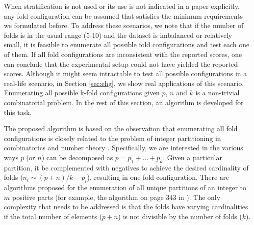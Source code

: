 \documentclass[3p, times]{elsarticle}
\begin{document}
When stratification is not used or its use is not indicated in a paper explicitly, any fold configuration can be assumed that satisfies the minimum requirements we formulated before. To address these scenarios, we note that if the number of folds is in the usual range (5-10) and the dataset is imbalanced or relatively small, it is feasible to enumerate all possible fold configurations and test each one of them. If all fold configurations are inconsistent with the reported scores, one can conclude that the experimental setup could not have yielded the reported scores. Although it might seem intractable to test all possible configurations in a real-life scenario, in Section \ref{sec:ehg}, we show real applications of this scenario. Enumerating all possible k-fold configurations given $p$, $n$ and $k$ is a non-trivial combinatorial problem. In the rest of this section, an algorithm is developed for this task.

The proposed algorithm is based on the observation that enumerating all fold configurations is closely related to the problem of integer partitioning in combinatorics and number theory \cite{intpart}. Specifically, we are interested in the various ways $p$ (or $n$) can be decomposed as $p = p_1 + \dots + p_k$. Given a particular partition, it be complemented with negatives to achieve the desired cardinality of folds ($n_i \sim (p + n)/k - p_i$), resulting in one fold configuration. There are algorithms proposed for the enumeration of all unique partitions of an integer to $m$ positive parts (for example, the algorithm on page 343 in \cite{intpart}). The only complexity that needs to be addressed is that the folds have varying cardinalities if the total number of elements ($p + n$) is not divisible by the number of folds ($k$).
\end{document}
